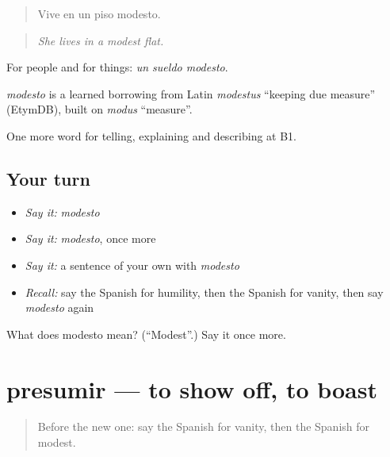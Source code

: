 \begin{quote}
Vive en un piso modesto.
\end{quote}

\begin{quote}
\emph{She lives in a modest flat.}
\end{quote}

For people and for things: \emph{un sueldo modesto}.

\begin{cousinweb}
\emph{modesto} is a learned borrowing from Latin \emph{modestus} \textquotedblleft{}keeping due measure\textquotedblright{} (EtymDB), built on \emph{modus} \textquotedblleft{}measure\textquotedblright{}.
\end{cousinweb}

\begin{grammarlens}[title={What you've built}]
One more word for telling, explaining and describing at B1.
\end{grammarlens}

\subsection*{Your turn}
\begin{itemize}
\raggedright
  \item \emph{Say it:} \emph{modesto}
  \item \emph{Say it:} \emph{modesto}, once more
  \item \emph{Say it:} a sentence of your own with \emph{modesto}
  \item \emph{Recall:} say the Spanish for humility, then the Spanish for vanity, then say \emph{modesto} again
\end{itemize}

\begin{tcolorbox}[breakable,colback=teal!4,colframe=teal!35!black,title={Before you move on}]
What does modesto mean? (\textquotedblleft{}Modest\textquotedblright{}.) Say it once more.
\end{tcolorbox}
\section[presumir]{presumir — to show off, to boast}

\label{lesson:ES-C726-presumir}



\begin{quote}
Before the new one: say the Spanish for vanity, then the Spanish for modest.
\end{quote}

